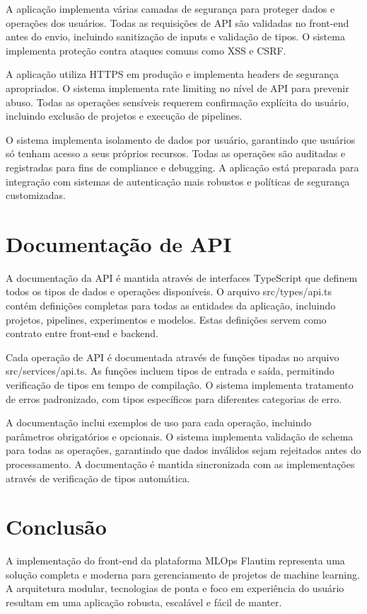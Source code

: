 \documentclass[12pt,a4paper]{article}
\begin{document}
A aplicação implementa várias camadas de segurança para proteger dados e operações dos usuários. Todas as requisições de API são validadas no front-end antes do envio, incluindo sanitização de inputs e validação de tipos. O sistema implementa proteção contra ataques comuns como XSS e CSRF.

A aplicação utiliza HTTPS em produção e implementa headers de segurança apropriados. O sistema implementa rate limiting no nível de API para prevenir abuso. Todas as operações sensíveis requerem confirmação explícita do usuário, incluindo exclusão de projetos e execução de pipelines.

O sistema implementa isolamento de dados por usuário, garantindo que usuários só tenham acesso a seus próprios recursos. Todas as operações são auditadas e registradas para fins de compliance e debugging. A aplicação está preparada para integração com sistemas de autenticação mais robustos e políticas de segurança customizadas.

\section{Documentação de API}

A documentação da API é mantida através de interfaces TypeScript que definem todos os tipos de dados e operações disponíveis. O arquivo src/types/api.ts contém definições completas para todas as entidades da aplicação, incluindo projetos, pipelines, experimentos e modelos. Estas definições servem como contrato entre front-end e backend.

Cada operação de API é documentada através de funções tipadas no arquivo src/services/api.ts. As funções incluem tipos de entrada e saída, permitindo verificação de tipos em tempo de compilação. O sistema implementa tratamento de erros padronizado, com tipos específicos para diferentes categorias de erro.

A documentação inclui exemplos de uso para cada operação, incluindo parâmetros obrigatórios e opcionais. O sistema implementa validação de schema para todas as operações, garantindo que dados inválidos sejam rejeitados antes do processamento. A documentação é mantida sincronizada com as implementações através de verificação de tipos automática.

\section{Conclusão}

A implementação do front-end da plataforma MLOps Flautim representa uma solução completa e moderna para gerenciamento de projetos de machine learning. A arquitetura modular, tecnologias de ponta e foco em experiência do usuário resultam em uma aplicação robusta, escalável e fácil de manter.
\end{document}
